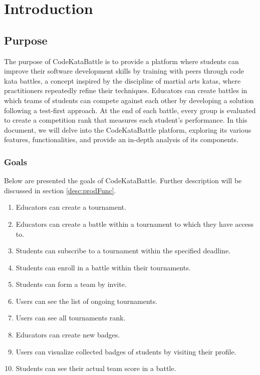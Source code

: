 \chapter{Introduction}

\section{Purpose}
The purpose of CodeKataBattle is to provide a platform where students can improve their software development skills by training with peers through code kata battles, a concept inspired by the discipline of martial arts katas, where practitioners repeatedly refine their techniques.
Educators can create battles in which teams of students can compete against each other by developing a solution following a test-first approach.
At the end of each battle, every group is evaluated to create a competition rank that measures each student's performance.
In this document, we will delve into the CodeKataBattle platform, exploring its various features, functionalities, and provide an in-depth analysis of its components.


\subsection{Goals}
Below are presented the goals of CodeKataBattle. Further description will be discussed in section \ref{desc:prodFunc}.
\begin{enumerate}[label=\textbf{G.\arabic*}]
	\item Educators can create a tournament.
        \item Educators can create a battle within a tournament to which they have access to.
        \item Students can subscribe to a tournament within the specified deadline.
        \item Students can enroll in a battle within their tournaments.
        \item Students can form a team by invite.
        \item Users can see the list of ongoing tournaments.
        \item Users can see all tournaments rank.
        \item Educators can create new badges.
        \item Users can visualize collected badges of students by visiting their profile.
        \item Students can see their actual team score in a battle.
\end{enumerate}

